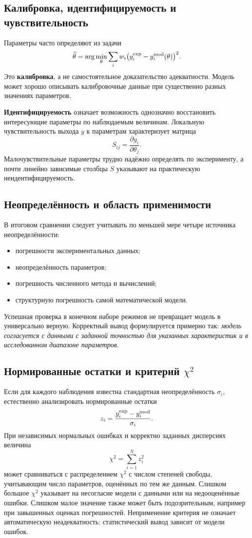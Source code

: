 \subsection{Калибровка, идентифицируемость и чувствительность}

Параметры часто определяют из задачи
\[
    \widehat\theta
    =\arg\min_{\theta}
    \sum_i w_i
    \bigl(y_i^{\rm exp}-y_i^{\rm mod}(\theta)\bigr)^2.
\]
Это \textbf{калибровка}, а не самостоятельное доказательство адекватности.
Модель может хорошо описывать калибровочные данные при существенно разных
значениях параметров.

\textbf{Идентифицируемость} означает возможность однозначно восстановить
интересующие параметры по наблюдаемым величинам. Локальную чувствительность
выхода $y$ к параметрам характеризует матрица
\[
    S_{ij}=\frac{\partial y_i}{\partial\theta_j}.
\]
Малочувствительные параметры трудно надёжно определять по эксперименту, а почти
линейно зависимые столбцы $S$ указывают на практическую неидентифицируемость.

\subsection{Неопределённость и область применимости}

В итоговом сравнении следует учитывать по меньшей мере четыре источника
неопределённости:
\begin{itemize}
    \item погрешности экспериментальных данных;
    \item неопределённость параметров;
    \item погрешность численного метода и вычислений;
    \item структурную погрешность самой математической модели.
\end{itemize}

Успешная проверка в конечном наборе режимов не превращает модель в универсально
верную. Корректный вывод формулируется примерно так: \emph{модель согласуется с
данными с заданной точностью для указанных характеристик и в исследованном
диапазоне параметров}.


\subsection[Нормированные остатки и критерий хи-квадрат]{Нормированные остатки и критерий $\chi^2$}

Если для каждого наблюдения известна стандартная неопределённость $\sigma_i$,
естественно анализировать нормированные остатки
\[
    z_i=\frac{y_i^{\rm exp}-y_i^{\rm mod}}{\sigma_i}.
\]
При независимых нормальных ошибках и корректно заданных дисперсиях величина
\[
    \boxed{\chi^2=\sum_{i=1}^{N}z_i^2}
\]
может сравниваться с распределением $\chi^2$ с числом степеней свободы,
учитывающим число параметров, оценённых по тем же данным. Слишком большое
$\chi^2$ указывает на несогласие модели с данными или на недооценённые ошибки.
Слишком малое значение также может быть подозрительным, например при завышенных
оценках погрешностей. Неприменение критерия не означает автоматическую
неадекватность: статистический вывод зависит от модели ошибок.

